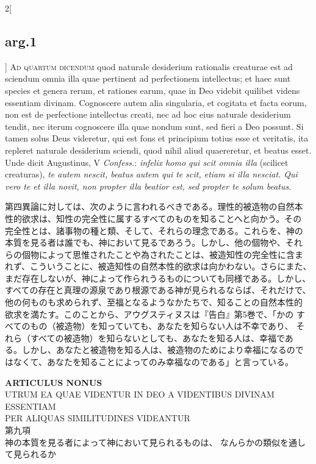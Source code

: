 \documentclass[paper=a4paper,fontsize=10pt,jafontsize=9pt,titlepage]{jlreq}
\begin{document}
\begin{paracol}{2}[\subsection{arg.1}]
{\scshape Ad quartum dicendum} quod naturale desiderium rationalis
creaturae est ad sciendum omnia illa quae pertinent ad perfectionem
intellectus; et haec sunt species et genera rerum, et rationes earum,
quae in Deo videbit quilibet videns essentiam divinam. Cognoscere
autem alia singularia, et cogitata et facta eorum, non est de
perfectione intellectus creati, nec ad hoc eius naturale desiderium
tendit, nec iterum cognoscere illa quae nondum sunt, sed fieri a Deo
possunt. Si tamen solus Deus videretur, qui est fons et principium
totius esse et veritatis, ita repleret naturale desiderium sciendi,
quod nihil aliud quaereretur, et beatus esset. Unde dicit Augustinus,
V {\itshape Confess.}: {\itshape infelix homo qui scit omnia illa} (scilicet
creaturas), {\itshape te autem nescit, beatus autem qui te scit, etiam si
illa nesciat. Qui vero te et illa novit, non propter illa beatior est,
sed propter te solum beatus}.

\switchcolumn

第四異論に対しては、次のように言われるべきである。理性的被造物の自然本
性的欲求は、知性の完全性に属するすべてのものを知ることへと向かう。その
完全性とは、諸事物の種と類、そして、それらの理念である。これらを、神の
本質を見る者は誰でも、神において見るであろう。しかし、他の個物や、それ
らの個物によって思惟されたことや為されたことは、被造知性の完全性に含ま
れず、こういうことに、被造知性の自然本性的欲求は向かわない。さらにまた、
まだ存在しないが、神によって作られうるものについても同様である。しかし、
すべての存在と真理の源泉であり根源である神が見られるならば、それだけで、
他の何ものも求められず、至福となるようなかたちで、知ることの自然本性的
欲求を満たす。このことから、アウグスティヌスは『告白』第5巻で、「かの
すべてのもの（被造物）を知っていても、あなたを知らない人は不幸であり、
それら（すべての被造物）を知らないとしても、あなたを知る人は、幸福であ
る。しかし、あなたと被造物を知る人は、被造物のためにより幸福になるので
はなくて、あなたを知ることによってのみ幸福なのである」と言っている。

\end{paracol}
\newpage

\begin{center}
 {\Large {\bfseries ARTICULUS NONUS}}\\{\large UTRUM EA QUAE VIDENTUR IN
DEO A VIDENTIBUS DIVINAM ESSENTIAM\\PER ALIQUAS SIMILITUDINES
VIDEANTUR\\第九項\\神の本質を見る者によって神において見られるものは、
なんらかの類似を通して見られるか}

\end{center} 
\end{document}
